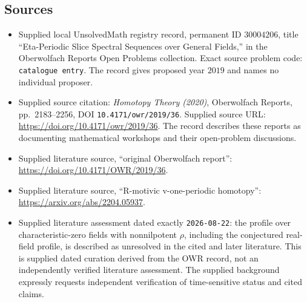 \documentclass[11pt]{article}
\begin{document}
\subsection{Sources}
\begin{itemize}
\item Supplied local UnsolvedMath registry record, permanent ID \(30004206\), title ``Eta-Periodic Slice Spectral Sequences over General Fields,'' in the Oberwolfach Reports Open Problems collection. Exact source problem code: \texttt{catalogue entry}. The record gives proposed year \(2019\) and names no individual proposer.
\item Supplied source citation: \emph{Homotopy Theory (2020)}, Oberwolfach Reports, pp.~2183--2256, DOI \texttt{10.4171/owr/2019/36}. Supplied source URL: \url{https://doi.org/10.4171/owr/2019/36}. The record describes these reports as documenting mathematical workshops and their open-problem discussions.
\item Supplied literature source, ``original Oberwolfach report'': \url{https://doi.org/10.4171/OWR/2019/36}.
\item Supplied literature source, ``R-motivic v-one-periodic homotopy'': \url{https://arxiv.org/abs/2204.05937}.
\item Supplied literature assessment dated exactly \texttt{2026-08-22}: the profile over characteristic-zero fields with nonnilpotent \(\rho\), including the conjectured real-field profile, is described as unresolved in the cited and later literature. This is supplied dated curation derived from the OWR record, not an independently verified literature assessment. The supplied background expressly requests independent verification of time-sensitive status and cited claims.
\end{itemize}
\end{document}
